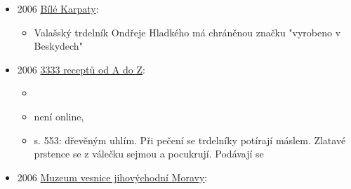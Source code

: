 \begin{itemize}
  \begin{itemize}
  \tightlist
  \item
    Vzpomínky na Slováckou búdu, významný kulturní centrum Luhačovic
  \item
    postavená roku 1906, architekt Dušan Jurkovič
  \item
    byla v soukromých rukách, pak zestátněná, po restitucích měnila
    majitele a 2002 vyhořela
  \item
    Jurkovič měl vybudovat moderní česko-slovenský lázně, ale nakonec se
    to naplnilo jen částečně, kvůli sporům v Akciové společnosti lázní
    luhačovických
  \item
    realizoval devět staveb a pět přestavěl
  \item
    búdu spravovalo vinařské obchodní družstvo ze Skalice
  \item
    Jurkovičova rodina byla s Luhačovicema spojená i z dřívějška:

    \begin{itemize}
    \tightlist
    \item
      Jurar Jurkovič, revolucionář z roku 1848 je často navštěval s
      Pavlem Blahem
    \item
      Pavel Blaho byl skalický kanovník a strýc jinýho Pavla Blaha,
      kterej byl lékař v Luhačovicích
    \item
      tři z dětí Juraje, Dušan, Anna a Emílie věnovaly Luhačovicím část
      života
    \item
      Emílie byla hospodyně, hostům se nabízely slovenský speciality,
      jako zázvorníky a trdelníky
    \end{itemize}
  \item
    chvalozpěv na trdelníky z roku 1909
  \end{itemize}
\item
  2006
  \href{https://ceskadigitalniknihovna.cz/uuid/uuid:1b16fb51-6afc-11e2-b4a8-001018b5eb5c}{Bílé
  Karpaty}:

  \begin{itemize}
  \tightlist
  \item
    Valašský trdelník Ondřeje Hladkého má chráněnou značku "vyrobeno v
    Beskydech"
  \end{itemize}
\item
  2006
  \href{https://ceskadigitalniknihovna.cz/uuid/uuid:616f5dc0-6adb-11e7-b92d-005056827e51}{3333
  receptů od A do Z}:

  \begin{itemize}
  \tightlist
  \item
  \item
    není online, 
  \item
    s. 553: dřevěným uhlím. Při pečení se trdelníky potírají máslem.
    Zlatavé prstence se z válečku sejmou a pocukrují. Podávají se
  \end{itemize}
\item
  2006
  \href{https://ceskadigitalniknihovna.cz/uuid/uuid:a7380140-967b-11e9-9209-005056827e51}{Muzeum
  vesnice jihovýchodní Moravy}:


\end{itemize}
